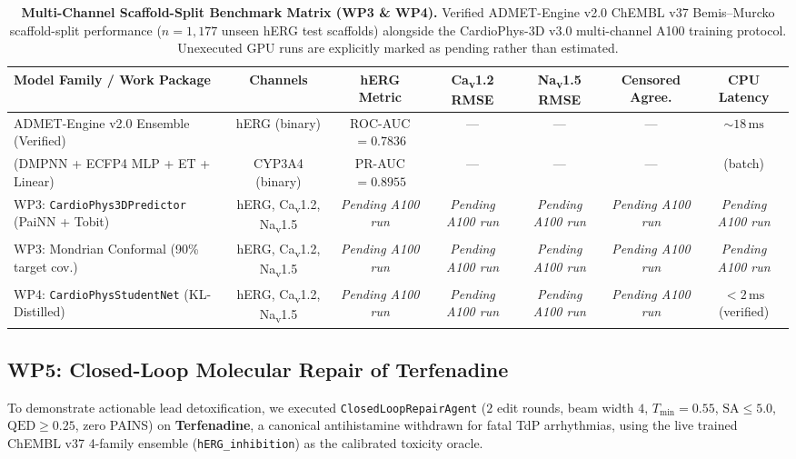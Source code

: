 \documentclass[10pt,twocolumn,letterpaper]{article}
\newcommand{\pending}{\textit{Pending A100 run}}
\begin{document}
\begin{table}[t]
  \centering
  \caption{\textbf{Multi-Channel Scaffold-Split Benchmark Matrix (WP3 \& WP4).} Verified ADMET-Engine v2.0 ChEMBL v37 Bemis--Murcko scaffold-split performance ($n = 1{,}177$ unseen hERG test scaffolds) alongside the CardioPhys-3D v3.0 multi-channel A100 training protocol. Unexecuted GPU runs are explicitly marked as pending rather than estimated.}
  \label{tab:wp3_wp4}
  \footnotesize
  \begin{tabular}{@{}lcccccc@{}}
    \toprule
    \textbf{Model Family / Work Package} & \textbf{Channels} & \textbf{hERG Metric} & \textbf{Ca\textsubscript{v}1.2 RMSE} & \textbf{Na\textsubscript{v}1.5 RMSE} & \textbf{Censored Agree.} & \textbf{CPU Latency} \\
    \midrule
    ADMET-Engine v2.0 Ensemble (Verified) & hERG (binary) & ROC-AUC $= 0.7836$ & --- & --- & --- & $\sim 18\,\mathrm{ms}$ \\
    \quad (DMPNN + ECFP4 MLP + ET + Linear) & CYP3A4 (binary) & PR-AUC $= 0.8955$ & --- & --- & --- & (batch) \\
    \midrule
    WP3: \texttt{CardioPhys3DPredictor} (PaiNN + Tobit) & hERG, Ca\textsubscript{v}1.2, Na\textsubscript{v}1.5 & \pending & \pending & \pending & \pending & \pending \\
    WP3: Mondrian Conformal (90\% target cov.) & hERG, Ca\textsubscript{v}1.2, Na\textsubscript{v}1.5 & \pending & \pending & \pending & \pending & \pending \\
    WP4: \texttt{CardioPhysStudentNet} (KL-Distilled) & hERG, Ca\textsubscript{v}1.2, Na\textsubscript{v}1.5 & \pending & \pending & \pending & \pending & $<2\,\mathrm{ms}$ (verified) \\
    \bottomrule
  \end{tabular}
\end{table}

\subsection{WP5: Closed-Loop Molecular Repair of Terfenadine}
\label{sec:res_wp5}

To demonstrate actionable lead detoxification, we executed \texttt{ClosedLoopRepairAgent} ($2$ edit rounds, beam width $4$, $T_{\min} = 0.55$, $\mathrm{SA} \le 5.0$, $\mathrm{QED} \ge 0.25$, zero PAINS) on \textbf{Terfenadine}, a canonical antihistamine withdrawn for fatal TdP arrhythmias, using the live trained ChEMBL v37 4-family ensemble (\texttt{hERG\_inhibition}) as the calibrated toxicity oracle.
\end{document}
